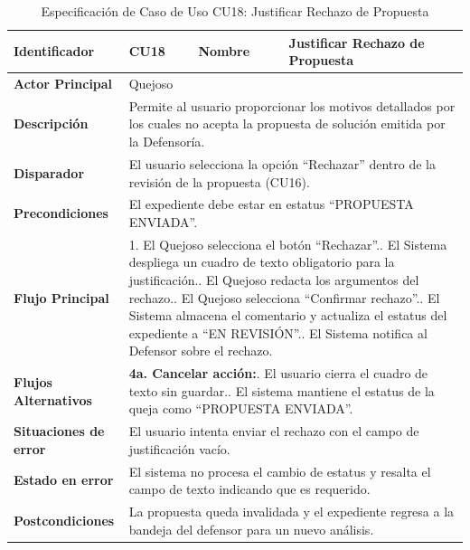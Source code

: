 \vspace{0.8cm}

\begingroup
\setlength{\parskip}{0pt}
\begin{longtable}{|p{3.5cm}|p{2cm}|p{2.5cm}|p{7cm}|}
\caption{Especificación de Caso de Uso CU18: Justificar Rechazo de Propuesta}
\label{tab:cu18_justificar_rechazo} \\
\hline
\textbf{Identificador} & CU18 & \textbf{Nombre} & Justificar Rechazo de Propuesta \\ \hline
\textbf{Actor Principal} & \multicolumn{3}{p{11.5cm}|}{Quejoso} \\ \hline
\textbf{Descripción} & \multicolumn{3}{p{11.5cm}|}{Permite al usuario proporcionar los motivos detallados por los cuales no acepta la propuesta de solución emitida por la Defensoría.} \\ \hline
\textbf{Disparador} & \multicolumn{3}{p{11.5cm}|}{El usuario selecciona la opción ``Rechazar'' dentro de la revisión de la propuesta (CU16).} \\ \hline
\textbf{Precondiciones} & \multicolumn{3}{p{11.5cm}|}{El expediente debe estar en estatus ``PROPUESTA ENVIADA''.} \\ \hline
\textbf{Flujo Principal} & \multicolumn{3}{p{11.5cm}|}{1. El Quejoso selecciona el botón ``Rechazar''.\newline 2. El Sistema despliega un cuadro de texto obligatorio para la justificación.\newline 3. El Quejoso redacta los argumentos del rechazo.\newline 4. El Quejoso selecciona ``Confirmar rechazo''.\newline 5. El Sistema almacena el comentario y actualiza el estatus del expediente a ``EN REVISIÓN''.\newline 6. El Sistema notifica al Defensor sobre el rechazo.} \\ \hline
\textbf{Flujos Alternativos} & \multicolumn{3}{p{11.5cm}|}{\textbf{4a. Cancelar acción:}\newline 1. El usuario cierra el cuadro de texto sin guardar.\newline 2. El sistema mantiene el estatus de la queja como ``PROPUESTA ENVIADA''.} \\ \hline
\textbf{Situaciones de error} & \multicolumn{3}{p{11.5cm}|}{El usuario intenta enviar el rechazo con el campo de justificación vacío.} \\ \hline
\textbf{Estado en error} & \multicolumn{3}{p{11.5cm}|}{El sistema no procesa el cambio de estatus y resalta el campo de texto indicando que es requerido.} \\ \hline
\textbf{Postcondiciones} & \multicolumn{3}{p{11.5cm}|}{La propuesta queda invalidada y el expediente regresa a la bandeja del defensor para un nuevo análisis.} \\ \hline
\end{longtable}
\endgroup

